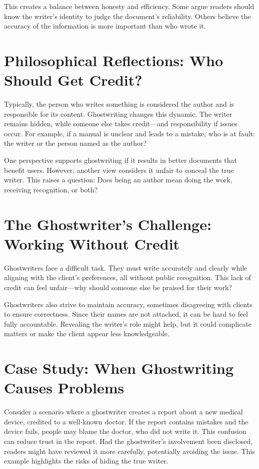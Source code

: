 \documentclass[a4paper,10pt,twocolumn]{memoir}
\begin{document}
This creates a balance between honesty and efficiency. Some argue readers should know the writer’s identity to judge the document’s reliability. Others believe the accuracy of the information is more important than who wrote it.

\section*{Philosophical Reflections: Who Should Get Credit?}
Typically, the person who writes something is considered the author and is responsible for its content. Ghostwriting changes this dynamic. The writer remains hidden, while someone else takes credit—and responsibility if issues occur. For example, if a manual is unclear and leads to a mistake, who is at fault: the writer or the person named as the author?

One perspective supports ghostwriting if it results in better documents that benefit users. However, another view considers it unfair to conceal the true writer. This raises a question: Does being an author mean doing the work, receiving recognition, or both?

\section*{The Ghostwriter’s Challenge: Working Without Credit}
Ghostwriters face a difficult task. They must write accurately and clearly while aligning with the client’s preferences, all without public recognition. This lack of credit can feel unfair—why should someone else be praised for their work?

Ghostwriters also strive to maintain accuracy, sometimes disagreeing with clients to ensure correctness. Since their names are not attached, it can be hard to feel fully accountable. Revealing the writer’s role might help, but it could complicate matters or make the client appear less knowledgeable.

\section*{Case Study: When Ghostwriting Causes Problems}
Consider a scenario where a ghostwriter creates a report about a new medical device, credited to a well-known doctor. If the report contains mistakes and the device fails, people may blame the doctor, who did not write it. This confusion can reduce trust in the report. Had the ghostwriter’s involvement been disclosed, readers might have reviewed it more carefully, potentially avoiding the issue. This example highlights the risks of hiding the true writer.
\end{document}
